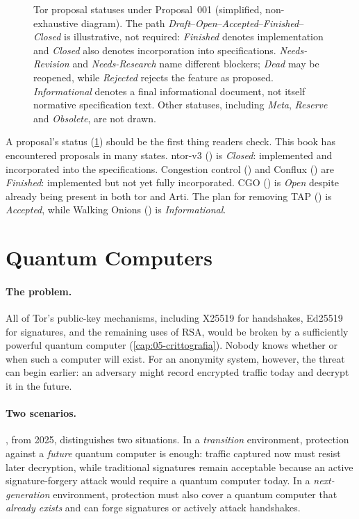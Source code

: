 \begin{figure}[htbp]
\centering

\caption{Tor proposal statuses under Proposal~001 (simplified, non-exhaustive diagram). The path \emph{Draft}--\emph{Open}--\emph{Accepted}--\emph{Finished}--\emph{Closed} is illustrative, not required: \emph{Finished} denotes implementation and \emph{Closed} also denotes incorporation into specifications. \emph{Needs-Revision} and \emph{Needs-Research} name different blockers; \emph{Dead} may be reopened, while \emph{Rejected} rejects the feature as proposed. \emph{Informational} denotes a final informational document, not itself normative specification text. Other statuses, including \emph{Meta}, \emph{Reserve} and \emph{Obsolete}, are not drawn.}
\label{fig:proposte}
\end{figure}

A proposal's status (\cref{fig:proposte}) should be the first thing readers check. This book has encountered proposals in many states. ntor-v3 () is \emph{Closed}: implemented and incorporated into the specifications. Congestion control () and Conflux () are \emph{Finished}: implemented but not yet fully incorporated. CGO () is \emph{Open} despite already being present in both tor and Arti. The plan for removing TAP () is \emph{Accepted}, while Walking Onions () is \emph{Informational}.

\section{Quantum Computers}\label{sec:fut-pq}

\paragraph{The problem.} All of Tor's public-key mechanisms, including X25519 for handshakes, Ed25519 for signatures, and the remaining uses of RSA, would be broken by a sufficiently powerful quantum computer (\cref{cap:05-crittografia}). Nobody knows whether or when such a computer will exist. For an anonymity system, however, the threat can begin earlier: an adversary might record encrypted traffic today and decrypt it in the future.

\paragraph{Two scenarios.} , from 2025, distinguishes two situations. In a \emph{transition} environment, protection against a \emph{future} quantum computer is enough: traffic captured now must resist later decryption, while traditional signatures remain acceptable because an active signature-forgery attack would require a quantum computer today. In a \emph{next-generation} environment, protection must also cover a quantum computer that \emph{already exists} and can forge signatures or actively attack handshakes.


